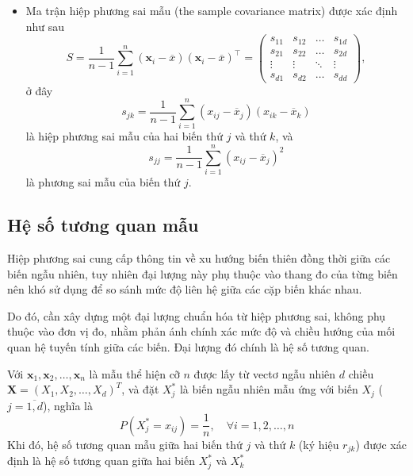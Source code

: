 \begin{itemize}
	\item Ma trận hiệp phương sai mẫu (the sample covariance matrix) được xác định như sau
	\begin{equation}
		S = \frac{1}{n-1} \sum_{i=1}^{n} (\bm{x}_i - \overline{x})(\bm{x}_i - \overline{x})^{\top} = 
		\begin{pmatrix}
			s_{11} & s_{12} & \dots & s_{1d} \\
			s_{21} & s_{22} & \dots & s_{2d} \\
			\vdots & \vdots & \ddots & \vdots \\
			s_{d1} & s_{d2} & \dots & s_{dd}
		\end{pmatrix},
	\end{equation}
	ở đây 
	\begin{equation}
		s_{jk} = \frac{1}{n-1} \sum_{i=1}^{n} (x_{ij} - \overline{x}_j)(x_{ik} - \overline{x}_k)
	\end{equation}
	là hiệp phương sai mẫu của hai biến thứ $j$ và thứ $k$, và 
	\begin{equation}
		s_{jj} = \frac{1}{n-1} \sum_{i=1}^{n} (x_{ij} - \overline{x}_j)^2
	\end{equation}
	là phương sai mẫu của biến thứ $j$.
\end{itemize}

\subsection{Hệ số tương quan mẫu}

Hiệp phương sai cung cấp thông tin về xu hướng biến thiên đồng thời giữa các biến ngẫu nhiên, tuy nhiên đại lượng này phụ thuộc vào thang đo của từng biến nên khó sử dụng để so sánh mức độ liên hệ giữa các cặp biến khác nhau.

Do đó, cần xây dựng một đại lượng chuẩn hóa từ hiệp phương sai, không phụ thuộc vào đơn vị đo, nhằm phản ánh chính xác mức độ và chiều hướng của mối quan hệ tuyến tính giữa các biến. Đại lượng đó chính là hệ số tương quan.

Với $\bm{x}_1, \bm{x}_2, \dots, \bm{x}_n$ là mẫu thể hiện cỡ $n$ được lấy từ vectơ ngẫu nhiên $d$ chiều $\bm{X} = (X_1, X_2, \dots, X_d)^T$, và đặt $X_j^*$ là biến ngẫu nhiên mẫu ứng với biến $X_j$ ($j=\overline{1,d}$), nghĩa là 
\begin{equation*}
	P(X_j^*=x_{ij}) = \frac{1}{n}, \quad \forall i= 1,2,\dots,n
\end{equation*} Khi đó, hệ số tương quan mẫu giữa hai biến thứ $j$ và thứ $k$ (ký hiệu $r_{jk}$) được xác định là hệ số tương quan giữa hai biến $X_j^*$ và $X_k^*$

